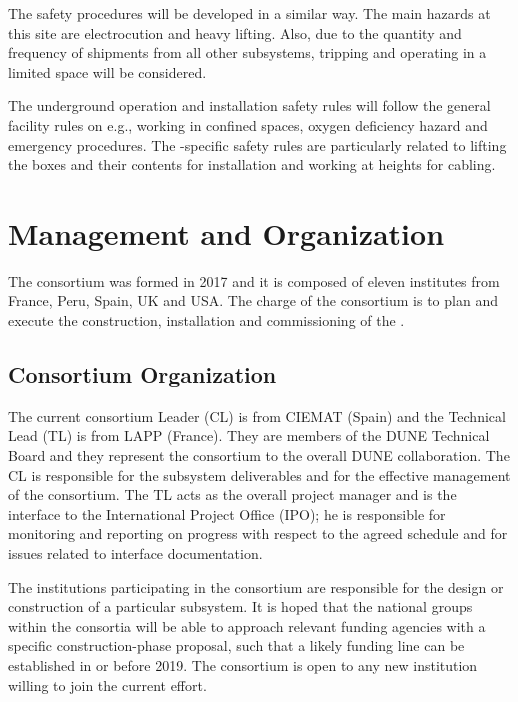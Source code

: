 The  \dual {} safety procedures will be developed in a similar way. The main hazards at this site are electrocution and heavy lifting. Also, due to the quantity and frequency of shipments from all other subsystems, tripping and operating in a limited space will be considered.

The underground operation and installation safety rules will %
follow the general facility rules on e.g., working in confined spaces, oxygen deficiency hazard and emergency procedures. The \dual {}-specific safety rules are particularly related to lifting the boxes and their contents %
for installation and working at heights for cabling.

\section{Management and Organization}
\label{sec:fddp-pd-12}

The \dual {} consortium was formed in 2017 and it is composed of eleven institutes from France, Peru, Spain, UK and USA. The charge of the \dual {} consortium is to plan and execute the construction, installation and commissioning of the  .


\subsection{Consortium Organization}
\label{sec:fddp-pd-12.1}

The current \dual {} consortium Leader (CL) is %
 from CIEMAT (Spain) and the Technical Lead (TL) is %
 from LAPP (France). They are members of the DUNE Technical Board and they represent the consortium to the overall DUNE collaboration. The CL is responsible for the subsystem deliverables and for the effective management of the consortium. The TL acts as the overall project manager and is the interface to the International Project Office (IPO); he is responsible for monitoring and reporting on progress with respect to the agreed schedule and for issues related to interface documentation.

The institutions participating in the consortium are responsible for the design or construction of a particular subsystem. It is hoped that the national groups within the consortia will be able to approach relevant funding agencies with a specific construction-phase proposal, such that a likely funding line can be established in or before 2019. The \dual {} consortium is open to any new institution willing to join the current effort.

